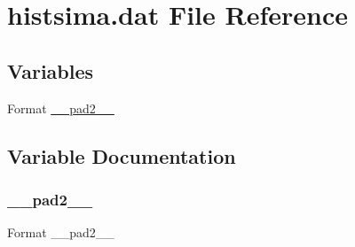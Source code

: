 \hypertarget{histsima_8dat}{}\section{histsima.\+dat File Reference}
\label{histsima_8dat}
\subsection*{Variables}
\begin{DoxyCompactItemize}
\item 
Format \hyperlink{histsima_8dat_ab9f9a0324921f2b035943e7f5250a945}{\+\_\+\+\_\+pad2\+\_\+\+\_\+}
\end{DoxyCompactItemize}


\subsection{Variable Documentation}
\mbox{\label{histsima_8dat_ab9f9a0324921f2b035943e7f5250a945}} 
\subsubsection{\texorpdfstring{\+\_\+\+\_\+pad2\+\_\+\+\_\+}{\_\_pad2\_\_}}
{\footnotesize\ttfamily Format \+\_\+\+\_\+pad2\+\_\+\+\_\+}

